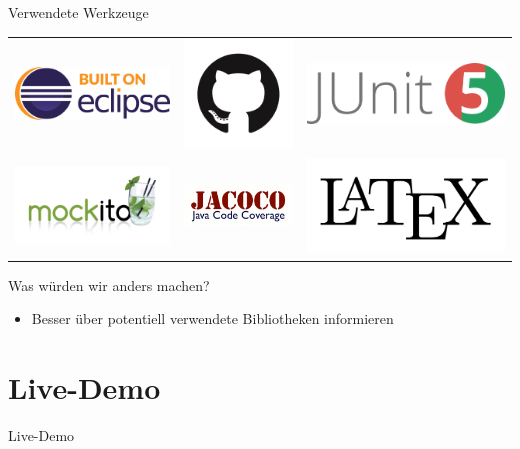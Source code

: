 \documentclass[18pt]{beamer}
\begin{document}
\begin{frame}{Verwendete Werkzeuge}
	\begin{tabular}{ccc}
		\includegraphics[width=0.3\linewidth, height=0.3\textheight, keepaspectratio]{bilder/eclipse.png} &
		\includegraphics[width=0.3\linewidth, height=0.3\textheight, keepaspectratio]{bilder/github.png} &
		\includegraphics[width=0.3\linewidth, height=0.3\textheight, keepaspectratio]{bilder/junit.png}\\
		\includegraphics[width=0.3\linewidth, height=0.3\textheight, keepaspectratio]{bilder/mockito.png} &
		\includegraphics[width=0.3\linewidth, height=0.3\textheight, keepaspectratio]{bilder/jacoco_logo.png} &
		\includegraphics[width=0.3\linewidth, height=0.3\textheight, keepaspectratio]{bilder/latex.png} \\
	\end{tabular}
	
\end{frame}
\begin{frame}{Was würden wir anders machen?}
 \begin{itemize}
  \item Besser über potentiell verwendete Bibliotheken informieren
 \end{itemize}

\end{frame}


\section{Live-Demo}
\begin{frame}
 \begin{center}
  \Huge Live-Demo
 \end{center}
\end{frame}
\end{document}
